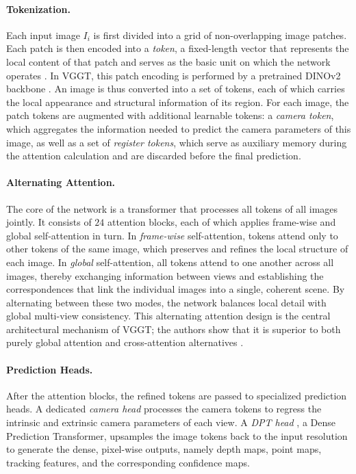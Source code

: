 \documentclass[english, egger, bsc]{vcethesis}
\begin{document}
\paragraph{Tokenization.}
Each input image $I_i$ is first divided into a grid of non-overlapping image patches. Each patch is then encoded into a \emph{token}, a fixed-length vector that represents the local content of that patch and serves as the basic unit on which the network operates \cite{dosovitskiy2021vit}. In VGGT, this patch encoding is performed by a pretrained DINOv2 backbone \cite{oquab2024dinov2}. An image is thus converted into a set of tokens, each of which carries the local appearance and structural information of its region. For each image, the patch tokens are augmented with additional learnable tokens: a \emph{camera token}, which aggregates the information needed to predict the camera parameters of this image, as well as a set of \emph{register tokens}, which serve as auxiliary memory during the attention calculation and are discarded before the final prediction.

\paragraph{Alternating Attention.}
The core of the network is a transformer \cite{vaswani2017attention} that processes all tokens of all images jointly. It consists of $24$ attention blocks, each of which applies frame-wise and global self-attention in turn. In \emph{frame-wise} self-attention, tokens attend only to other tokens of the same image, which preserves and refines the local structure of each image. In \emph{global} self-attention, all tokens attend to one another across all images, thereby exchanging information between views and establishing the correspondences that link the individual images into a single, coherent scene. By alternating between these two modes, the network balances local detail with global multi-view consistency. This alternating attention design is the central architectural mechanism of VGGT; the authors show that it is superior to both purely global attention and cross-attention alternatives \cite{wang2025vggt}.

\paragraph{Prediction Heads.}
After the attention blocks, the refined tokens are passed to specialized prediction heads. A dedicated \emph{camera head} processes the camera tokens to regress the intrinsic and extrinsic camera parameters of each view. A \emph{DPT head} \cite{Ranftl2021}, a Dense Prediction Transformer, upsamples the image tokens back to the input resolution to generate the dense, pixel-wise outputs, namely depth maps, point maps, tracking features, and the corresponding confidence maps. 
\end{document}
